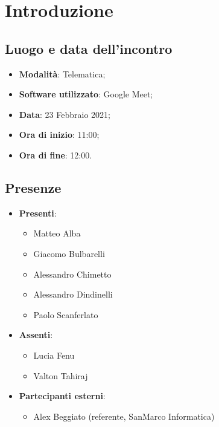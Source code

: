 \documentclass[]{article}
\begin{document}
	
	
	
	\newpage
	
	
	\section{Introduzione}
		\subsection{Luogo e data dell'incontro}
		\begin{itemize}
			\item \textbf{Modalità}: Telematica;
			\item \textbf{Software utilizzato}: Google Meet;
			\item \textbf{Data}: 23 Febbraio 2021;
			\item \textbf{Ora di inizio}: 11:00;
			\item \textbf{Ora di fine}: 12:00.
		\end{itemize}
		
		\subsection{Presenze}
		\begin{itemize}
			\item \textbf{Presenti}: 
			\begin{itemize}
				\item Matteo Alba
				\item Giacomo Bulbarelli
				\item Alessandro Chimetto
				\item Alessandro Dindinelli
				\item Paolo Scanferlato
			\end{itemize}
			\item \textbf{Assenti}:
			\begin{itemize}
				\item Lucia Fenu
				\item Valton Tahiraj
			\end{itemize}
			\item \textbf{Partecipanti esterni}:
			\begin{itemize}
				\item Alex Beggiato (referente, SanMarco Informatica)
			\end{itemize}	
		\end{itemize}
		
\end{document}
